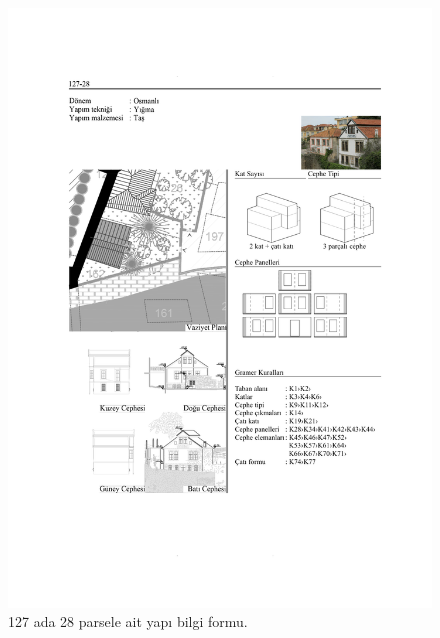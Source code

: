 \begin{figure}
\centering
\includegraphics[width=1\textwidth,height=\textheight]{source/figures/BilgiFormlari/127-28.pdf}
\caption{127 ada 28 parsele ait yapı bilgi formu.}
\end{figure}

